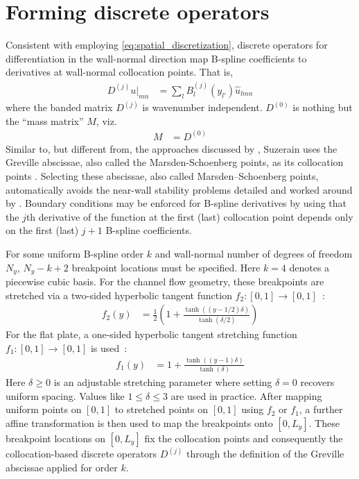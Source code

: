 \documentclass[letterpaper,11pt,nointlimits,reqno,draft]{amsbook}
\begin{document}
\section{Forming discrete operators}
\label{sec:formingoperators}

Consistent with employing \eqref{eq:spatial_discretization}, discrete operators
for differentiation in the wall-normal direction map B-spline coefficients to
derivatives at wall-normal collocation points.  That is,
\begin{align}
  D^{(j)} u\bigr|_{m n}
&= \sum_{l} B^{(j)}_l\!\left(y_{l'}\right)
   \hat{u}_{l m n}
\end{align}
where the banded matrix $D^{(j)}$ is wavenumber independent.  $D^{(0)}$ is
nothing but the ``mass matrix'' $M$, viz.
\begin{align}
  M &= D^{(0)}
\end{align}
Similar to, but different from, the approaches discussed by
\citet[\textsection{}2.1.3]{Kwok2001}, Suzerain uses the Greville abscissae,
also called the Marsden-Schoenberg points, as its collocation points
\citep{Johnson2005Higher,Botella2003Bspline}.  Selecting these abscissae, also
called Marsden--Schoenberg points, automatically avoids the near-wall stability
problems detailed and worked around by \citet[\textsection{}4.4]{Kwok2001}.
Boundary conditions may be enforced for B-spline derivatives by using that the
$j$th derivative of the function at the first (last) collocation point depends
only on the first (last) $j+1$ B-spline coefficients.

For some uniform B-spline order $k$ and wall-normal number of degrees of
freedom $N_y$, $N_y - k + 2$ breakpoint locations must be specified.  Here
$k=4$ denotes a piecewise cubic basis.  For the channel flow geometry, these
breakpoints are stretched via a two-sided hyperbolic tangent function
$f_2:\left[0,1\right]\to\left[0,1\right]$~\citep{Vinokur1983Onedimensional}:
\begin{align}\label{eq:htstretch2}
  f_2\!\left(y\right) &= \frac{1}{2}\left(1 + \frac{
      \tanh\left(\left(y-1/2\right)\delta\right)
  }{
      \tanh\left(\delta/2\right)
  }\right)
\end{align}
For the flat plate, a one-sided hyperbolic tangent stretching
function $f_1:\left[0,1\right]\to\left[0,1\right]$
is used~\citep{Vinokur1983Onedimensional}:
\begin{align}\label{eq:htstretch1}
  f_1\!\left(y\right) &= 1 + \frac{
      \tanh\left(\left(y-1\right)\delta\right)
  }{
      \tanh\left(\delta\right)
  }
\end{align}
Here $\delta\geq{}0$ is an adjustable stretching parameter where setting
$\delta=0$ recovers uniform spacing.  Values like $1\leq{}\delta\leq{}3$ are
used in practice.  After mapping uniform points on $\left[0,1\right]$ to
stretched points on $\left[0,1\right]$ using $f_2$ or $f_1$, a further affine
transformation is then used to map the breakpoints onto $\left[0, L_y\right]$.
These breakpoint locations on $\left[0, L_y\right]$ fix the collocation points
and consequently the collocation-based discrete operators $D^{(j)}$ through the
definition of the Greville abscissae applied for order $k$.
\end{document}
